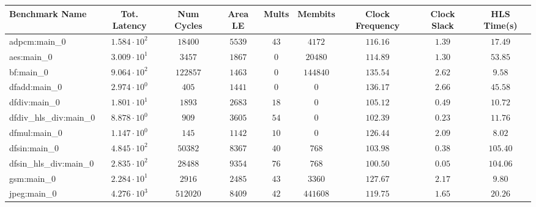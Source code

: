 \begin{tabular}{|l|c|c|c|c|c|c|c|c|}
\hline
Benchmark Name          & Tot. Latency           & Num Cycles & Area LE   & Mults   & Membits    & Clock Frequency & Clock Slack & HLS Time(s) \\
\hline
adpcm:main\_0           & $ 1.584 \cdot 10^{2} $ & $ 18400  $ & $ 5539  $ & $ 43  $ & $ 4172   $ & $ 116.16      $ & $ 1.39    $ & $ 17.49   $ \\
aes:main\_0             & $ 3.009 \cdot 10^{1} $ & $ 3457   $ & $ 1867  $ & $ 0   $ & $ 20480  $ & $ 114.89      $ & $ 1.30    $ & $ 53.85   $ \\
bf:main\_0              & $ 9.064 \cdot 10^{2} $ & $ 122857 $ & $ 1463  $ & $ 0   $ & $ 144840 $ & $ 135.54      $ & $ 2.62    $ & $ 9.58    $ \\
dfadd:main\_0           & $ 2.974 \cdot 10^{0} $ & $ 405    $ & $ 1441  $ & $ 0   $ & $ 0      $ & $ 136.17      $ & $ 2.66    $ & $ 45.58   $ \\
dfdiv:main\_0           & $ 1.801 \cdot 10^{1} $ & $ 1893   $ & $ 2683  $ & $ 18  $ & $ 0      $ & $ 105.12      $ & $ 0.49    $ & $ 10.72   $ \\
dfdiv\_hls\_div:main\_0 & $ 8.878 \cdot 10^{0} $ & $ 909    $ & $ 3605  $ & $ 54  $ & $ 0      $ & $ 102.39      $ & $ 0.23    $ & $ 11.76   $ \\
dfmul:main\_0           & $ 1.147 \cdot 10^{0} $ & $ 145    $ & $ 1142  $ & $ 10  $ & $ 0      $ & $ 126.44      $ & $ 2.09    $ & $ 8.02    $ \\
dfsin:main\_0           & $ 4.845 \cdot 10^{2} $ & $ 50382  $ & $ 8367  $ & $ 40  $ & $ 768    $ & $ 103.98      $ & $ 0.38    $ & $ 105.40  $ \\
dfsin\_hls\_div:main\_0 & $ 2.835 \cdot 10^{2} $ & $ 28488  $ & $ 9354  $ & $ 76  $ & $ 768    $ & $ 100.50      $ & $ 0.05    $ & $ 104.06  $ \\
gsm:main\_0             & $ 2.284 \cdot 10^{1} $ & $ 2916   $ & $ 2485  $ & $ 43  $ & $ 3360   $ & $ 127.67      $ & $ 2.17    $ & $ 9.80    $ \\
jpeg:main\_0            & $ 4.276 \cdot 10^{3} $ & $ 512020 $ & $ 8409  $ & $ 42  $ & $ 441608 $ & $ 119.75      $ & $ 1.65    $ & $ 20.26   $ \\

\end{tabular}
